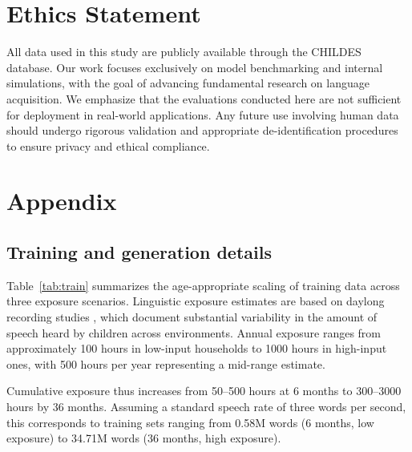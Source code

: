 \section{Ethics Statement}

All data used in this study are publicly available through the CHILDES database. Our work focuses exclusively on model benchmarking and internal simulations, with the goal of advancing fundamental research on language acquisition. We emphasize that the evaluations conducted here are not sufficient for deployment in real-world applications. Any future use involving human data should undergo rigorous validation and appropriate de-identification procedures to ensure privacy and ethical compliance.




%

\newpage

\section{Appendix}

\subsection{Training and generation details}

Table~\ref{tab:train} summarizes the age-appropriate scaling of training data across three exposure scenarios. Linguistic exposure estimates are based on daylong recording studies \citep{cristia2019child}, which document substantial variability in the amount of speech heard by children across environments. Annual exposure ranges from approximately 100 hours in low-input households to 1000 hours in high-input ones, with 500 hours per year representing a mid-range estimate.

Cumulative exposure thus increases from 50–500 hours at 6 months to 300–3000 hours by 36 months. Assuming a standard speech rate of three words per second, this corresponds to training sets ranging from 0.58M words (6 months, low exposure) to 34.71M words (36 months, high exposure).


